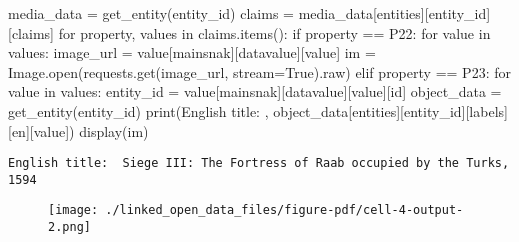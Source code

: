 \documentclass[
  letterpaper,
  DIV=11,
  numbers=noendperiod]{scrreprt}
\newenvironment{Shaded}{\begin{snugshade}}{\end{snugshade}}
\newcommand{\BuiltInTok}[1]{\textcolor[rgb]{0.00,0.23,0.31}{#1}}
\newcommand{\ControlFlowTok}[1]{\textcolor[rgb]{0.00,0.23,0.31}{#1}}
\newcommand{\KeywordTok}[1]{\textcolor[rgb]{0.00,0.23,0.31}{#1}}
\newcommand{\NormalTok}[1]{\textcolor[rgb]{0.00,0.23,0.31}{#1}}
\newcommand{\OperatorTok}[1]{\textcolor[rgb]{0.37,0.37,0.37}{#1}}
\newcommand{\StringTok}[1]{\textcolor[rgb]{0.13,0.47,0.30}{#1}}
\newcommand{\VariableTok}[1]{\textcolor[rgb]{0.07,0.07,0.07}{#1}}
\begin{document}
\begin{Shaded}
\begin{Highlighting}[]
\NormalTok{media\_data }\OperatorTok{=}\NormalTok{ get\_entity(entity\_id)}
\NormalTok{claims }\OperatorTok{=}\NormalTok{ media\_data[}\StringTok{\textquotesingle{}entities\textquotesingle{}}\NormalTok{][entity\_id][}\StringTok{\textquotesingle{}claims\textquotesingle{}}\NormalTok{]}
\ControlFlowTok{for} \BuiltInTok{property}\NormalTok{, values }\KeywordTok{in}\NormalTok{ claims.items():}
    \ControlFlowTok{if} \BuiltInTok{property} \OperatorTok{==} \StringTok{\textquotesingle{}P22\textquotesingle{}}\NormalTok{:}
        \ControlFlowTok{for}\NormalTok{ value }\KeywordTok{in}\NormalTok{ values:}
\NormalTok{            image\_url }\OperatorTok{=}\NormalTok{ value[}\StringTok{\textquotesingle{}mainsnak\textquotesingle{}}\NormalTok{][}\StringTok{\textquotesingle{}datavalue\textquotesingle{}}\NormalTok{][}\StringTok{\textquotesingle{}value\textquotesingle{}}\NormalTok{]}
\NormalTok{            im }\OperatorTok{=}\NormalTok{ Image.}\BuiltInTok{open}\NormalTok{(requests.get(image\_url, stream}\OperatorTok{=}\VariableTok{True}\NormalTok{).raw)}
    \ControlFlowTok{elif} \BuiltInTok{property} \OperatorTok{==} \StringTok{\textquotesingle{}P23\textquotesingle{}}\NormalTok{:}
        \ControlFlowTok{for}\NormalTok{ value }\KeywordTok{in}\NormalTok{ values:}
\NormalTok{            entity\_id }\OperatorTok{=}\NormalTok{ value[}\StringTok{\textquotesingle{}mainsnak\textquotesingle{}}\NormalTok{][}\StringTok{\textquotesingle{}datavalue\textquotesingle{}}\NormalTok{][}\StringTok{\textquotesingle{}value\textquotesingle{}}\NormalTok{][}\StringTok{\textquotesingle{}id\textquotesingle{}}\NormalTok{]}
\NormalTok{            object\_data }\OperatorTok{=}\NormalTok{ get\_entity(entity\_id)}
\BuiltInTok{print}\NormalTok{(}\StringTok{\textquotesingle{}English title: \textquotesingle{}}\NormalTok{, object\_data[}\StringTok{\textquotesingle{}entities\textquotesingle{}}\NormalTok{][entity\_id][}\StringTok{\textquotesingle{}labels\textquotesingle{}}\NormalTok{][}\StringTok{\textquotesingle{}en\textquotesingle{}}\NormalTok{][}\StringTok{\textquotesingle{}value\textquotesingle{}}\NormalTok{])}
\NormalTok{display(im)}
\end{Highlighting}
\end{Shaded}

\begin{verbatim}
English title:  Siege III: The Fortress of Raab occupied by the Turks, 1594
\end{verbatim}

\begin{figure}[H]

{\centering \texttt{[image: ./linked\_open\_data\_files/figure-pdf/cell-4-output-2.png]}

}

\end{figure}
\end{document}
